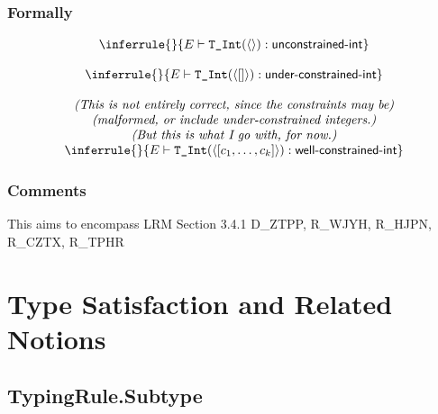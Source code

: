 \documentclass{book}
\newcommand\RuleComment[1]{\textit{(#1)}}
\newcommand\isunconstrainedinteger[0]{\textsf{unconstrained-int}}
\newcommand\isunderconstrainedinteger[0]{\textsf{under-constrained-int}}
\newcommand\iswellconstrainedinteger[0]{\textsf{well-constrained-int}}
\newcommand\unconstrainedinteger[0]{\TInt(\langle\rangle)}
\begin{document}
\begin{emptyformal}
    \subsection{Formally}

\[
\begin{array}{c}
\inferrule{}{E \entails \unconstrainedinteger : \isunconstrainedinteger}\\
\\
\inferrule{}{E \entails \TInt(\langle [] \rangle) : \isunderconstrainedinteger}\\
\\
\RuleComment{This is not entirely correct, since the constraints may be}\\
\RuleComment{malformed, or include under-constrained integers.}\\
\RuleComment{But this is what I go with, for now.}\\
\inferrule{}{E \entails \TInt(\langle [c_1,\ldots,c_k]\rangle) : \iswellconstrainedinteger}
\end{array}
\]     
    
\begin{comment}
ROMAN: see note about domains.
\end{comment}
\end{emptyformal}

\subsection{Comments}
    This aims to encompass LRM Section 3.4.1 D\_ZTPP, R\_WJYH, R\_HJPN, R\_CZTX, R\_TPHR

\chapter{Type Satisfaction and Related Notions}

\begin{comment}
It is not obvious to me why sometimes we check for type satisfaction and other times we check the structure of a type.
\end{comment}

\section{TypingRule.Subtype} 
\end{document}
